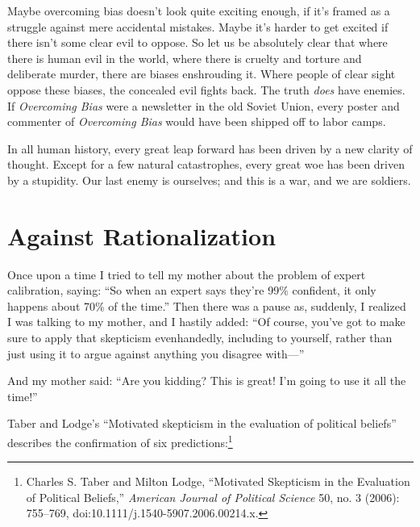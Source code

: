 {
 Maybe overcoming bias doesn't look quite exciting
enough, if it's framed as a struggle against mere
accidental mistakes. Maybe it's harder to get excited
if there isn't some clear evil to oppose. So let us be
absolutely clear that where there is human evil in the world, where
there is cruelty and torture and deliberate murder, there are biases
enshrouding it. Where people of clear sight oppose these biases, the
concealed evil fights back. The truth \textit{does} have enemies. If
\textit{Overcoming Bias} were a newsletter in the old Soviet Union,
every poster and commenter of \textit{Overcoming Bias} would have been
shipped off to labor camps.}

{
 In all human history, every great leap forward has been driven by
a new clarity of thought. Except for a few natural catastrophes, every
great woe has been driven by a stupidity. Our last enemy is ourselves;
and this is a war, and we are soldiers.}

\myendsectiontext


\bigskip


\chapter{Against Rationalization}


{
 Once upon a time I tried to tell my mother about the problem of
expert calibration, saying: ``So when an expert says
they're 99\% confident, it only happens about 70\% of
the time.'' Then there was a pause as, suddenly, I
realized I was talking to my mother, and I hastily added:
``Of course, you've got to make sure
to apply that skepticism evenhandedly, including to yourself, rather
than just using it to argue against anything you disagree
with---'' }

{
 And my mother said: ``Are you kidding? This is
great! I'm going to use it all the
time!''}

{
 Taber and Lodge's ``Motivated
skepticism in the evaluation of political beliefs''
describes the confirmation of six predictions:\footnote{Charles S. Taber and Milton Lodge, ``Motivated
Skepticism in the Evaluation of Political Beliefs,''
\textit{American Journal of Political Science} 50, no. 3 (2006):
755--769, doi:10.1111/j.1540-5907.2006.00214.x.}}

